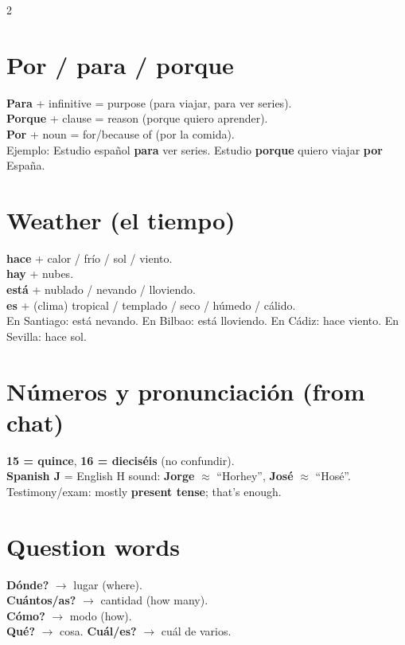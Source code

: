 \documentclass[10pt,landscape,a4paper]{article}
\begin{document}
\begin{multicols}{2}
\section*{\color{accent}Por / para / porque}
\textbf{Para} + infinitive = purpose (para viajar, para ver series).\\
\textbf{Porque} + clause = reason (porque quiero aprender).\\
\textbf{Por} + noun = for/because of (por la comida).\\
Ejemplo: Estudio espa\~nol \textbf{para} ver series. Estudio \textbf{porque} quiero viajar \textbf{por} Espa\~na.

\section*{\color{accent}Weather (el tiempo)}
\textbf{hace} + calor / fr\'io / sol / viento.\\
\textbf{hay} + nubes.\\
\textbf{est\'a} + nublado / nevando / lloviendo.\\
\textbf{es} + (clima) tropical / templado / seco / h\'umedo / c\'alido.\\
En Santiago: est\'a nevando. En Bilbao: est\'a lloviendo. En C\'adiz: hace viento. En Sevilla: hace sol.

\section*{\color{accent}N\'umeros y pronunciaci\'on (from chat)}
\textbf{15 = quince}, \textbf{16 = diecis\'eis} (no confundir).\\
\textbf{Spanish J} = English H sound: \textbf{Jorge} $\approx$ ``Horhey'', \textbf{Jos\'e} $\approx$ ``Hos\'e''.\\
Testimony/exam: mostly \textbf{present tense}; that's enough.

\section*{\color{accent}Question words}
\textbf{\textquestiondown D\'onde?} $\to$ lugar (where).\\
\textbf{\textquestiondown Cu\'antos/as?} $\to$ cantidad (how many).\\
\textbf{\textquestiondown C\'omo?} $\to$ modo (how).\\
\textbf{\textquestiondown Qu\'e?} $\to$ cosa. \textbf{\textquestiondown Cu\'al/es?} $\to$ cu\'al de varios.


\end{multicols}
\end{document}
